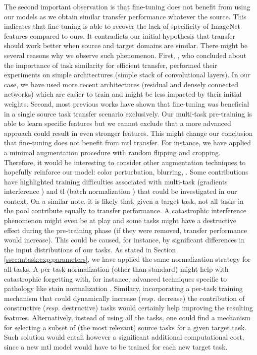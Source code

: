 The second important observation is that fine-tuning does not benefit from using our models as we obtain similar transfer performance whatever the source. This indicates that fine-tuning is able to recover the lack of specificity of ImageNet features compared to ours. It contradicts our initial hypothesis that transfer should work better when source and target domains are similar. There might be several reasons why we observe such phenomenon. First, \citeauthor{yosinski2014transferable} \cite{yosinski2014transferable}, who concluded about the importance of task similarity for efficient transfer, performed their experiments on simple architectures (\eg simple stack of convolutional layers). In our case, we have used more recent architectures (\ie residual and densely connected networks) which are easier to train and might be less impacted by their initial weights. Second, most previous works have shown that fine-tuning was beneficial in a single source task transfer scenario exclusively. Our multi-task pre-training is able to learn specific features but we cannot exclude that a more advanced approach could result in even stronger features. This might change our conclusion that fine-tuning does not benefit from \acrshort{mtl} transfer. For instance, we have applied a minimal augmentation procedure with random flipping and cropping. Therefore, it would be interesting to consider other augmentation techniques to hopefully reinforce our model: color perturbation, blurring, \etc. Some contributions have highlighted training difficulties associated with multi-task (\eg gradients interference \cite{yu2020gradient}) and \acrlong{tl} (\eg batch normalization \cite{chang2019domain}) that could be investigated in our context. On a similar note, it is likely that, given a target task, not all tasks in the pool contribute equally to transfer performance. A catastrophic interference phenomenon might even be at play and some tasks might have a destructive effect during the pre-training phase (\ie if they were removed, transfer performance would increase). This could be caused, for instance, by significant differences in the input distributions of our tasks. As stated in Section \ref{ssec:mtask:exp:parameters}, we have applied the same normalization strategy for all tasks. A per-task normalization (other than standard) might help with catastrophic forgetting with, for instance, advanced techniques specific to pathology like stain normalization \cite{kang2021stainnet, runz2021normalization, zhao2022restainnet}. Similary, incorporating a per-task training mechanism that could dynamically increase (\textit{resp.} decrease) the contribution of constructive (\textit{resp.} destructive) tasks would certainly help improving the resulting features. Alternatively, instead of using all the tasks, one could find a mechanism for selecting a subset of (the most relevant) source tasks for a given target task. Such solution would entail however a significant additional computational cost, since a new \acrshort{mtl} model would have to be trained for each new target task. 

